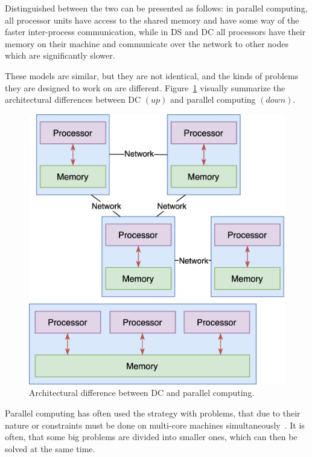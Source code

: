 Distinguished between the two can be presented as follows: in parallel computing, all processor units have access to the shared memory and have some way of the faster inter-process communication, while in DS and DC all processors have their memory on their machine and communicate over the network to other nodes which are significantly slower. 

These models are similar, but they are not identical, and the kinds of problems they are designed to work on are different. Figure~\ref{fig:fig4} visually summarize the architectural  differences between DC $(up)$ and parallel computing $(down)$.

\begin{figure}[H]
	\begin{center}
		\includegraphics[scale=0.8]{images/Figure4.png}
	\end{center}
	\vspace{-0.6cm}
	\caption{Architectural difference between DC and parallel computing.}
	\label{fig:fig4}
\end{figure}

\noindent
Parallel computing has often used the strategy with problems, that due to their nature or constraints must be done on multi-core machines simultaneously~\cite{0072397}. It is often, that some big problems are divided into smaller ones, which can then be solved at the same time. 


